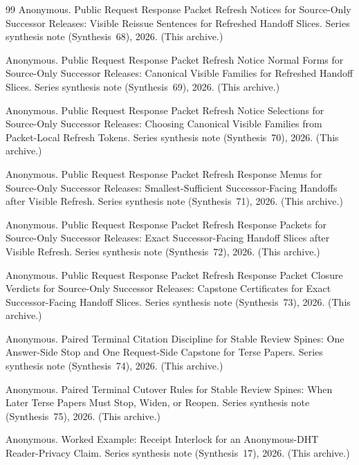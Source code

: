 \documentclass[11pt]{article}
\begin{document}
\begin{thebibliography}{99}
Anonymous.
\newblock Public Request Response Packet Refresh Notices for Source-Only Successor Releases: Visible Reissue Sentences for Refreshed Handoff Slices.
\newblock Series synthesis note (Synthesis~68), 2026. (This archive.)

Anonymous.
\newblock Public Request Response Packet Refresh Notice Normal Forms for Source-Only Successor Releases: Canonical Visible Families for Refreshed Handoff Slices.
\newblock Series synthesis note (Synthesis~69), 2026. (This archive.)

Anonymous.
\newblock Public Request Response Packet Refresh Notice Selections for Source-Only Successor Releases: Choosing Canonical Visible Families from Packet-Local Refresh Tokens.
\newblock Series synthesis note (Synthesis~70), 2026. (This archive.)

Anonymous.
\newblock Public Request Response Packet Refresh Response Menus for Source-Only Successor Releases: Smallest-Sufficient Successor-Facing Handoffs after Visible Refresh.
\newblock Series synthesis note (Synthesis~71), 2026. (This archive.)

Anonymous.
\newblock Public Request Response Packet Refresh Response Packets for Source-Only Successor Releases: Exact Successor-Facing Handoff Slices after Visible Refresh.
\newblock Series synthesis note (Synthesis~72), 2026. (This archive.)

Anonymous.
\newblock Public Request Response Packet Refresh Response Packet Closure Verdicts for Source-Only Successor Releases: Capstone Certificates for Exact Successor-Facing Handoff Slices.
\newblock Series synthesis note (Synthesis~73), 2026. (This archive.)

Anonymous.
\newblock Paired Terminal Citation Discipline for Stable Review Spines: One Answer-Side Stop and One Request-Side Capstone for Terse Papers.
\newblock Series synthesis note (Synthesis~74), 2026. (This archive.)

Anonymous.
\newblock Paired Terminal Cutover Rules for Stable Review Spines: When Later Terse Papers Must Stop, Widen, or Reopen.
\newblock Series synthesis note (Synthesis~75), 2026. (This archive.)

Anonymous.
\newblock Worked Example: Receipt Interlock for an Anonymous-DHT Reader-Privacy Claim.
\newblock Series synthesis note (Synthesis~17), 2026. (This archive.)

\end{thebibliography}
\end{document}
